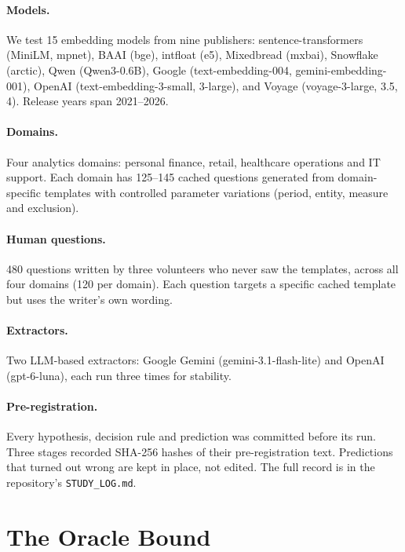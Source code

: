 \documentclass[11pt,a4paper]{article}
\begin{document}
\paragraph{Models.} We test 15 embedding models from nine publishers:
sentence-transformers (MiniLM, mpnet), BAAI (bge), intfloat (e5),
Mixedbread (mxbai), Snowflake (arctic), Qwen (Qwen3-0.6B), Google
(text-embedding-004, gemini-embedding-001), OpenAI (text-embedding-3-small,
3-large), and Voyage (voyage-3-large, 3.5, 4). Release years span
2021--2026.

\paragraph{Domains.} Four analytics domains: personal finance, retail,
healthcare operations and IT support. Each domain has 125--145 cached questions
generated from domain-specific templates with controlled parameter
variations (period, entity, measure and exclusion).

\paragraph{Human questions.} 480 questions written by three volunteers who
never saw the templates, across all four domains (120 per domain). Each
question targets a specific cached template but uses the writer's own
wording.

\paragraph{Extractors.} Two LLM-based extractors: Google Gemini
(gemini-3.1-flash-lite) and OpenAI (gpt-6-luna), each run three times for
stability.

\paragraph{Pre-registration.} Every hypothesis, decision rule and
prediction was committed before its run. Three stages recorded SHA-256
hashes of their pre-registration text. Predictions that turned out wrong
are kept in place, not edited. The full record is in the repository's
\texttt{STUDY\_LOG.md}.

\section{The Oracle Bound}
\label{sec:oracle}
\end{document}
